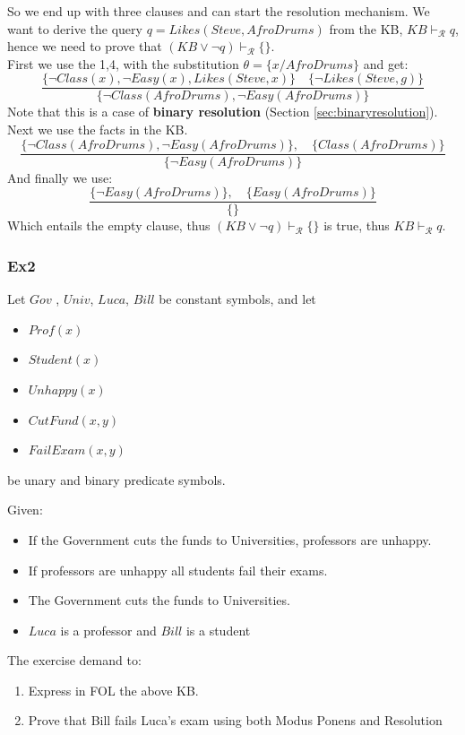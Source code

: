 \documentclass[10pt,a4paper]{article}
\begin{document}
So we end up with three clauses and can start the resolution mechanism. We want to derive the query $q=Likes(Steve,AfroDrums)$ from the KB, $KB\vdash_{\mathcal{R}}q$, hence we need to prove that $(KB \vee \neg q) \vdash_{\mathcal{R}} \{\}$.\\
First we use the 1,4, with the substitution $\theta=\lbrace x/AfroDrums\rbrace$ and get:
\[\frac{\lbrace \neg Class(x), \neg Easy(x), Likes(Steve,x)\rbrace\quad \lbrace \neg Likes(Steve,g)\rbrace}{\lbrace \neg Class(AfroDrums), \neg Easy(AfroDrums) \rbrace}\]
Note that this is a case of \textbf{binary resolution} (Section \ref{sec:binaryresolution}). Next we use the facts in the KB.
\[\frac{\lbrace \neg Class(AfroDrums),\neg Easy(AfroDrums) \rbrace,\quad \lbrace Class(AfroDrums) \rbrace}{\lbrace \neg Easy(AfroDrums) \rbrace}\]
And finally we use:
\[\frac{\lbrace \neg Easy(AfroDrums) \rbrace,\quad \lbrace Easy(AfroDrums) \rbrace}{\lbrace \rbrace}\]
Which entails the empty clause, thus $(KB \vee \neg q) \vdash_{\mathcal{R}} \{\}$ is true, thus $KB\vdash_{\mathcal{R}}q$.

\subsubsection{Ex2}
Let $Gov$ , $Univ$, $Luca$, $Bill$ be constant symbols, and let

\begin{itemize}
\item $Prof(x)$
\item $Student(x)$
\item $Unhappy(x)$
\item $CutFund(x,y)$
\item $FailExam(x,y)$
\end{itemize}
be unary and binary predicate symbols.

Given:
\begin{itemize}
\item If the Government cuts the funds to Universities, professors are unhappy.
\item If professors are unhappy all students fail their exams.
\item The Government cuts the funds to Universities.
\item $Luca$ is a professor and $Bill$ is a student
\end{itemize}

The exercise demand to:
\begin{enumerate}
\item Express in FOL the above KB.
\item Prove that Bill fails Luca’s exam using both Modus Ponens and Resolution
\end{enumerate}
\end{document}
